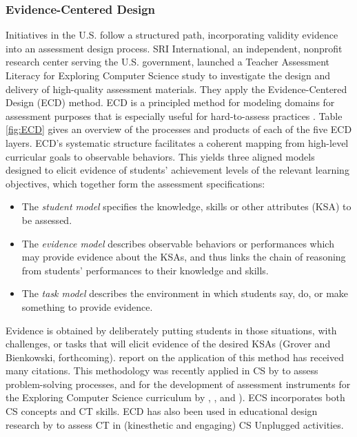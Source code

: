 %



\subsubsection{Evidence-Centered Design}\label{sec:ECD}
Initiatives in the U.S. follow a structured path, incorporating validity evidence into an assessment design process. SRI International, an independent, nonprofit research center serving the U.S. government, launched a Teacher Assessment Literacy for Exploring Computer Science study to investigate the design and delivery of high-quality assessment materials. They apply the Evidence-Centered Design (ECD) method. ECD is a principled method for modeling domains for assessment purposes that is especially useful for hard-to-assess practices \cite{grover2016assessing}. Table \ref{fig:ECD} gives an overview of the processes and products of each of the five ECD layers. ECD's systematic structure facilitates a coherent mapping from high-level curricular goals to observable behaviors. This yields three aligned models designed to elicit evidence of students' achievement levels of the relevant learning objectives, which together form the assessment specifications:
\begin{itemize}
\item The \emph{student model} specifies the knowledge, skills or other attributes (KSA) to be assessed.
\item The \emph{evidence model} describes observable behaviors or performances which may provide evidence about the KSAs, and thus links the chain of reasoning from students' performances to their knowledge and skills.
\item The \emph{task model} describes the environment in which students say, do, or make something to provide evidence.
\end{itemize}

Evidence is obtained by deliberately putting students in those situations, with challenges, or tasks that will elicit evidence of the desired KSAs (Grover and Bienkowski, forthcoming).  report on the application of this method has received many citations. This methodology was recently applied in CS by  to assess problem-solving processes, and for the development of assessment instruments for the Exploring Computer Science curriculum by , , and ). ECS incorporates both CS concepts and CT skills. ECD has also been used in educational design research by \cite{rodriguez2017assessingCTunplugged} to assess CT in (kinesthetic and engaging) CS Unplugged activities.



